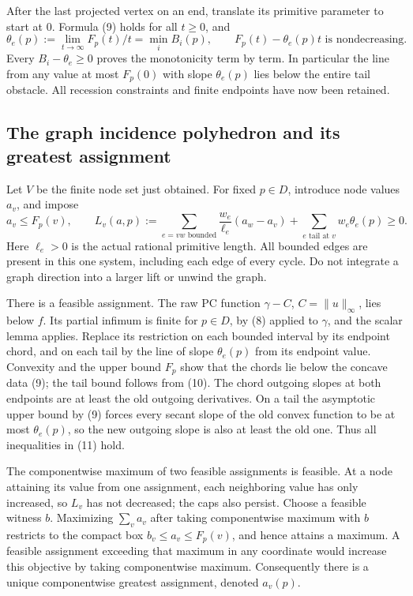 \documentclass[
  11pt,
]{article}
\begin{document}
After the last projected vertex on an end, translate its primitive
parameter to start at 0. Formula (9) holds for all \(t\geq0\), and \[
 \theta_e(p):=\lim_{t\to\infty}F_p(t)/t=\min_i B_i(p),\qquad
 F_p(t)-\theta_e(p)t\text{ is nondecreasing}.             \tag{10}
\] Every \(B_i-\theta_e\geq0\) proves the monotonicity term by term. In
particular the line from any value at most \(F_p(0)\) with slope
\(\theta_e(p)\) lies below the entire tail obstacle. All recession
constraints and finite endpoints have now been retained.

\subsection{The graph incidence polyhedron and its greatest
assignment}\label{the-graph-incidence-polyhedron-and-its-greatest-assignment}

Let \(V\) be the finite node set just obtained. For fixed \(p\in D\),
introduce node values \(a_v\), and impose \[
 a_v\leq F_p(v),\qquad
 L_v(a,p):=\sum_{e=vw\text{ bounded}}\frac{w_e}{\ell_e}(a_w-a_v)
                +\sum_{e\text{ tail at }v}w_e\theta_e(p)\geq0.             \tag{11}
\] Here \(\ell_e>0\) is the actual rational primitive length. All
bounded edges are present in this one system, including each edge of
every cycle. Do not integrate a graph direction into a larger lift or
unwind the graph.

There is a feasible assignment. The raw PC function \(\gamma-C\),
\(C=\|u\|_\infty\), lies below \(f\). Its partial infimum is finite for
\(p\in D\), by (8) applied to \(\gamma\), and the scalar lemma applies.
Replace its restriction on each bounded interval by its endpoint chord,
and on each tail by the line of slope \(\theta_e(p)\) from its endpoint
value. Convexity and the upper bound \(F_p\) show that the chords lie
below the concave data (9); the tail bound follows from (10). The chord
outgoing slopes at both endpoints are at least the old outgoing
derivatives. On a tail the asymptotic upper bound by (9) forces every
secant slope of the old convex function to be at most \(\theta_e(p)\),
so the new outgoing slope is also at least the old one. Thus all
inequalities in (11) hold.

The componentwise maximum of two feasible assignments is feasible. At a
node attaining its value from one assignment, each neighboring value has
only increased, so \(L_v\) has not decreased; the caps also persist.
Choose a feasible witness \(b\). Maximizing \(\sum_v a_v\) after taking
componentwise maximum with \(b\) restricts to the compact box
\(b_v\leq a_v\leq F_p(v)\), and hence attains a maximum. A feasible
assignment exceeding that maximum in any coordinate would increase this
objective by taking componentwise maximum. Consequently there is a
unique componentwise greatest assignment, denoted \(a_v(p)\).
\end{document}
